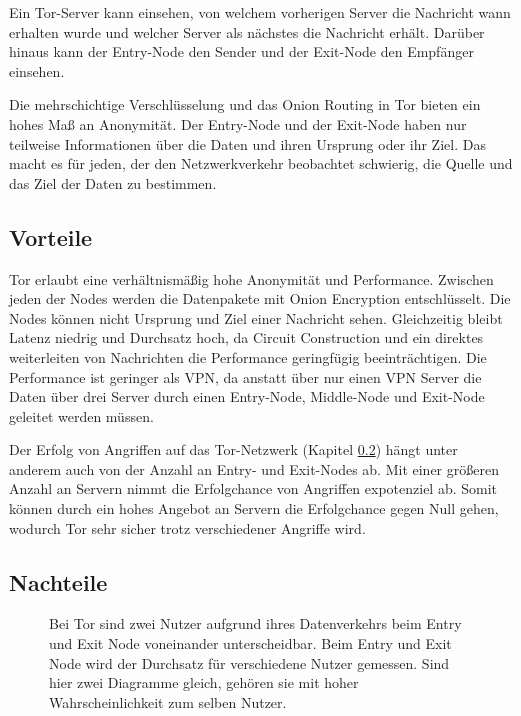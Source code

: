 Ein Tor-Server kann einsehen, von welchem vorherigen Server die Nachricht wann erhalten wurde und welcher Server als nächstes die Nachricht erhält. Darüber hinaus kann der Entry-Node den Sender und der Exit-Node den Empfänger einsehen.

Die mehrschichtige Verschlüsselung und das Onion Routing in Tor bieten ein hohes Maß an Anonymität. Der Entry-Node und der Exit-Node haben nur teilweise Informationen über die Daten und ihren Ursprung oder ihr Ziel. Das macht es für jeden, der den Netzwerkverkehr beobachtet schwierig, die Quelle und das Ziel der Daten zu bestimmen\cite{TorWhitePaper}.

\subsection{Vorteile}
\label{chap:tor_advantages}

Tor erlaubt eine verhältnismäßig hohe Anonymität und Performance. Zwischen jeden der Nodes werden die Datenpakete mit Onion Encryption entschlüsselt. Die Nodes können nicht Ursprung und Ziel einer Nachricht sehen. Gleichzeitig bleibt Latenz niedrig und Durchsatz hoch, da Circuit Construction und ein direktes weiterleiten von Nachrichten die Performance geringfügig beeinträchtigen. Die Performance ist geringer als VPN, da anstatt über nur einen VPN Server die Daten über drei Server durch einen Entry-Node, Middle-Node und Exit-Node geleitet werden müssen\cite{PerformanceAndSecurityTor}.

Der Erfolg von Angriffen auf das Tor-Netzwerk (Kapitel \ref{chap:tor_disatvantages}) hängt unter anderem auch von der Anzahl an Entry- und Exit-Nodes ab. Mit einer größeren Anzahl an Servern nimmt die Erfolgchance von Angriffen expotenziel ab. Somit können durch ein hohes Angebot an Servern die Erfolgchance gegen Null gehen, wodurch Tor sehr sicher trotz verschiedener Angriffe wird.

\subsection{Nachteile}
\label{chap:tor_disatvantages}

\begin{figure}[h!]
    \centering
    
    \caption{Bei Tor sind zwei Nutzer aufgrund ihres Datenverkehrs beim Entry und Exit Node voneinander unterscheidbar. Beim Entry und Exit Node wird der Durchsatz für verschiedene Nutzer gemessen. Sind hier zwei Diagramme gleich, gehören sie mit hoher Wahrscheinlichkeit zum selben Nutzer.}
    \label{imgs:tor_transfer}
\end{figure}

